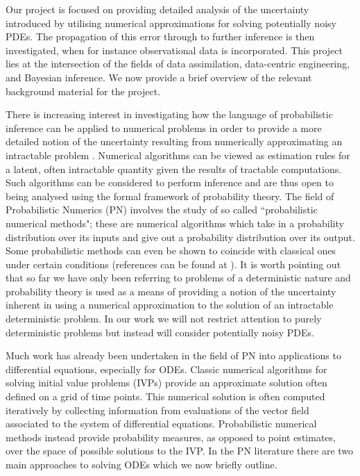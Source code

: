 Our project is focused on providing detailed analysis of the uncertainty introduced by utilising numerical approximations for solving potentially noisy PDEs. The propagation of this error through to further inference is then investigated, when for instance observational data is incorporated. This project lies at the intersection of the fields of data assimilation, data-centric engineering, and Bayesian inference. We now provide a brief overview of the relevant background material for the project.

There is increasing interest in investigating how the language of probabilistic inference can be applied to numerical problems in order to provide a more detailed notion of the uncertainty resulting from numerically approximating an intractable problem \textcolor{blue}{\citep{diaconis1988bayesian,o1992bayesian,skilling1992bayesian,hennig2015probabilistic}}. Numerical algorithms can be viewed as estimation rules for a latent, often intractable quantity given the results of tractable computations. Such algorithms can be considered to perform inference and are thus open to being analysed using the formal framework of probability theory. The field of Probabilistic Numerics (PN) \textcolor{blue}{\citep{probNumericsSite}} involves the study of so called ``probabilistic numerical methods"; these are numerical algorithms which take in a probability distribution over its inputs and give out a probability distribution over its output. Some probabilistic methods can even be shown to coincide with classical ones under certain conditions (references can be found at \textcolor{blue}{\citep{probNumericsSite}}). It is worth pointing out that so far we have only been referring to problems of a deterministic nature and probability theory is used as a means of providing a notion of the uncertainty inherent in using a numerical approximation to the solution of an intractable deterministic problem. In our work we will not restrict attention to purely deterministic problems but instead will consider potentially noisy PDEs.

Much work has already been undertaken in the field of PN into applications to differential equations, especially for ODEs. Classic numerical algorithms for solving initial value problems (IVPs) provide an approximate solution often defined on a grid of time points. This numerical solution is often computed iteratively by collecting information from evaluations of the vector field associated to the system of differential equations. Probabilistic numerical methods instead provide probability measures, as opposed to point estimates, over the space of possible solutions to the IVP. In the PN literature there are two main approaches to solving ODEs which we now briefly outline.

